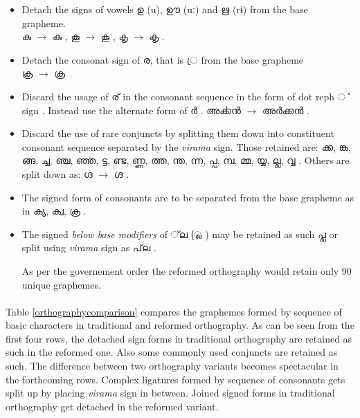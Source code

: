 \documentclass[10pt]{article}
\begin{document}
\begin{itemize}
\item
Detach the signs of vowels {\manjari ഉ} (u), {\manjari ഊ} (uː) and {\manjari ഋ} (rɨ) from the base grapheme.\\ 
{\manjari കു } $\rightarrow$ {\raghu കു }, 
{\manjari കൂ } $\rightarrow$ {\raghu കൂ }, 
{\manjari കൃ } $\rightarrow$ {\raghu കൃ }.
\item 
Detach the consonat sign of  {\manjari  ര}, that is {\manjari  ്ര } from the base grapheme \\
{\manjari ക്ര  } $\rightarrow$ {\raghu ക്ര  } 
\item
Discard the usage of {\manjari ര് } in the consonant sequence in the form of dot reph {\manjari ൎ }  sign .  Instead use the alternate form of {\manjari ർ }. {\manjari അൎക്കൻ } $\rightarrow$ {\manjari അർക്കൻ }. 

\item
Discard the use of rare conjuncts by splitting them down into constituent consonant sequence separated by the \textit{virama} sign. Those retained are: {\manjari ക്ക, ങ്ക, ങ്ങ, ച്ച, ഞ്ച, ഞ്ഞ, ട്ട, ണ്ട, ണ്ണ, ത്ത, ന്ത, ന്ന, പ്പ, മ്പ, മ്മ, യ്യ, ല്ല, വ്വ }. Others are split down as: {\manjari ഗ്ദ } $\rightarrow$ {\raghu ഗ്ദ }. 

\item
The signed form of consonants are to be separated from the base grapheme as in {\raghu ക്യ, ക്വ, ക്ര }.

\item
The signed \textit{below base modifiers} of {\manjari  ്‌ല  (്ല )  } may be retained as such {\manjari പ്ല } or split using \textit{virama} sign as {\manjari  പ്‌ല }.

As per the governement order the reformed orthography would retain only 90 unique graphemes.
\end{itemize}

\paragraph{}
Table \ref{orthographycomparison} compares the graphemes formed by sequence of basic characters in traditional and reformed orthography. As can be seen from the first four rows, the detached sign forms in traditional orthography are retained as such in the reformed one. Also some commonly used conjuncts are retained as such. The difference between two orthography variants becomes spectacular in the forthcoming rows. Complex ligatures formed by sequence of consonants gets split up by placing \textit{virama} sign in between. Joined signed forms in traditional orthography get detached in the reformed variant.
\end{document}
